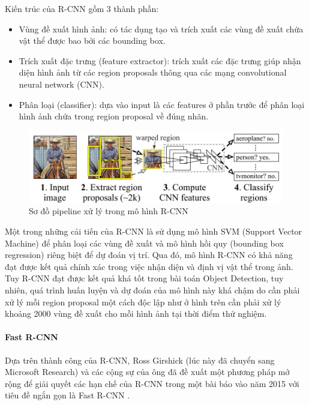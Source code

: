 Kiến trúc của R-CNN gồm 3 thành phần:
\begin{itemize}[noitemsep, topsep=0pt, leftmargin=1.25em, label={$-$}]
    \item Vùng đề xuất hình ảnh: có tác dụng tạo và trích xuất các vùng đề xuất chứa vật thể được bao bởi các bounding box. 
    \item Trích xuất đặc trưng (feature extractor): trích xuất các đặc trưng giúp nhận diện hình ảnh từ các region proposals thông qua các mạng convolutional neural network (CNN).
    \item Phân loại (classifier): dựa vào input là các features ở phần trước để phân loại hình ảnh chứa trong region proposal về đúng nhãn.
\end{itemize}
\graphicspath{{figures/}}
\begin{figure}[h!]
  \centering
  \includegraphics[scale=0.45]{graphics/RCNN.jpg}
  \caption{Sơ đồ pipeline xử lý trong mô hình R-CNN}
\end{figure}

Một trong những cải tiến của R-CNN là sử dụng mô hình SVM (Support Vector Machine) để phân loại các vùng đề xuất và mô hình hồi quy (bounding box regression) riêng biệt để dự đoán vị trí. Qua đó, mô hình R-CNN có khả năng đạt được kết quả chính xác trong việc nhận diện và định vị vật thể trong ảnh.\\
Tuy R-CNN đạt được kết quả khá tốt trong bài toán Object Detection, tuy nhiên, quá trình huấn luyện và dự đoán của mô hình này khá chậm do cần phải xử lý mỗi region proposal một cách độc lập như ở hình trên cần phải xử lý khoảng 2000 vùng đề xuất cho mỗi hình ảnh tại thời điểm thử nghiệm.

\paragraph{Fast R-CNN\\}
Dựa trên thành công của R-CNN, Ross Girshick (lúc này đã chuyển sang Microsoft Research) và các cộng sự của ông đã đề xuất một phương pháp mở rộng để giải quyết các hạn chế của R-CNN trong một bài báo vào năm 2015 với tiêu đề ngắn gọn là Fast R-CNN \cite{fastrcnn}.

